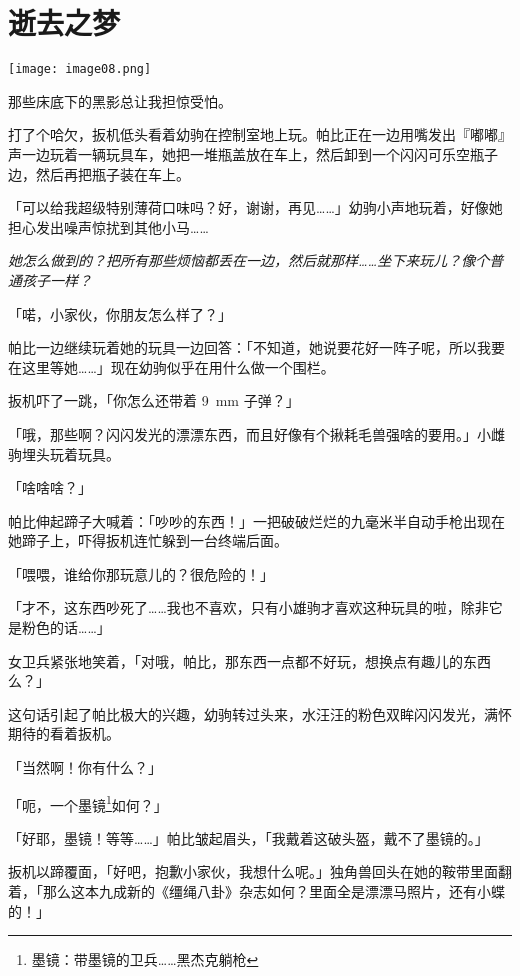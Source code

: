 \chapter{逝去之梦}

\texttt{[image: image08.png]}

\begin{intro}
那些床底下的黑影总让我担惊受怕。
\end{intro}


打了个哈欠，扳机低头看着幼驹在控制室地上玩。帕比正在一边用嘴发出『嘟嘟』声一边玩着一辆玩具车，她把一堆瓶盖放在车上，然后卸到一个闪闪可乐空瓶子边，然后再把瓶子装在车上。

「可以给我超级特别薄荷口味吗？好，谢谢，再见……」幼驹小声地玩着，好像她担心发出噪声惊扰到其他小马……

\emph{她怎么做到的？把所有那些烦恼都丢在一边，然后就那样……坐下来玩儿？像个普通孩子一样？}

「喏，小家伙，你朋友怎么样了？」

帕比一边继续玩着她的玩具一边回答：「不知道，她说要花好一阵子呢，所以我要在这里等她……」现在幼驹似乎在用什么做一个围栏。

扳机吓了一跳，「你怎么还带着 \SI{9}{mm} 子弹？」

「哦，那些啊？闪闪发光的漂漂东西，而且好像有个揪耗毛兽强啥的要用。」小雌驹埋头玩着玩具。

「啥啥啥？」

帕比伸起蹄子大喊着：「吵吵的东西！」一把破破烂烂的九毫米半自动手枪出现在她蹄子上，吓得扳机连忙躲到一台终端后面。

「喂喂，谁给你那玩意儿的？很危险的！」

「才不，这东西吵死了……我也不喜欢，只有小雄驹才喜欢这种玩具的啦，除非它是粉色的话……」

女卫兵紧张地笑着，「对哦，帕比，那东西一点都不好玩，想换点有趣儿的东西么？」

这句话引起了帕比极大的兴趣，幼驹转过头来，水汪汪的粉色双眸闪闪发光，满怀期待的看着扳机。

「当然啊！你有什么？」

「呃，一个墨镜\footnote{墨镜：带墨镜的卫兵……黑杰克躺枪}如何？」

「好耶，墨镜！等等……」帕比皱起眉头，「我戴着这破头盔，戴不了墨镜的。」

扳机以蹄覆面，「好吧，抱歉小家伙，我想什么呢。」独角兽回头在她的鞍带里面翻着，「那么这本九成新的《缰绳八卦》杂志如何？里面全是漂漂马照片，还有小蝶的！」

